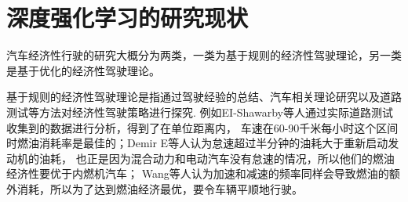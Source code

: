 \section{深度强化学习的研究现状}
汽车经济性行驶的研究大概分为两类，一类为基于规则的经济性驾驶理论，另一类是基于优化的经济性驾驶理论。

基于规则的经济性驾驶理论是指通过驾驶经验的总结、汽车相关理论研究以及道路测试等方法对经济性驾驶策略进行探究.
例如EI-Shawarby等人通过实际道路测试收集到的数据进行分析，得到了在单位距离内，
车速在60-90千米每小时这个区间时燃油消耗率是最佳的；Demir E等人认为怠速超过半分钟的油耗大于重新启动发动机的油耗，
也正是因为混合动力和电动汽车没有怠速的情况，所以他们的燃油经济性要优于内燃机汽车；
Wang等人认为加速和减速的频率同样会导致燃油的额外消耗，所以为了达到燃油经济最优，要令车辆平顺地行驶。


